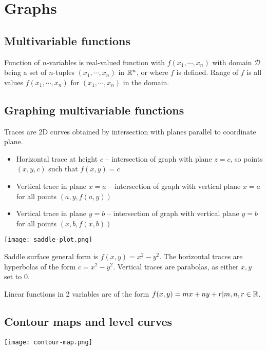 \section{Graphs}

\subsection{Multivariable functions}

Function of $n$-variables is real-valued function with $f(x_1,\cdots,x_n)$ with domain $\mathcal{D}$
being a set of $n$-tuples $(x_1,\cdots,x_n)$ in $\mathbb{R}^n$, or where $f$ is defined.
Range of $f$ is all values $f(x_1,\cdots,x_n)$ for $(x_1,\cdots,x_n)$ in the domain.

\subsection{Graphing multivariable functions}

Traces are 2D curves obtained by intersection with planes parallel to coordinate plane.
\begin{itemize}
    \item Horizontal trace at height $c$ -- intersection of graph with plane $z=c$, so points $(x,y,c)$ such that $f(x,y)=c$
    \item Vertical trace in plane $x=a$ -- intersection of graph with vertical plane $x=a$ for all points $(a,y,f(a,y))$
    \item Vertical trace in plane $y=b$ -- intersection of graph with vertical plane $y=b$ for all points $(x,b,f(x,b))$
\end{itemize}

\begin{center}
    \texttt{[image: saddle-plot.png]}
\end{center}

Saddle surface general form is $f(x,y)=x^2-y^2$. The horizontal traces are hyperbolas of the form $c=x^2-y^2$.
Vertical traces are parabolas, as either $x,y$ set to 0.\newline

\noindent
Linear functions in 2 variables are of the form $f(x,y)=mx+ny+r|m,n,r\in \mathbb{R}$.

\subsection{Contour maps and level curves}

\begin{center}
    \texttt{[image: contour-map.png]}
\end{center}


